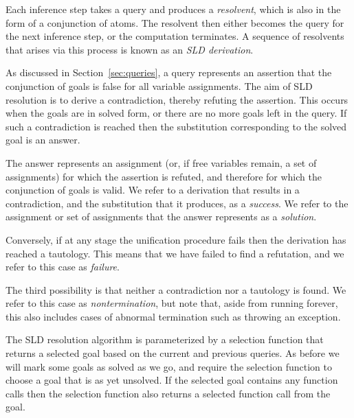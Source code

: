 Each inference step takes a query
and produces a \emph{resolvent\label{gi:resolvent}},
which is also in the form of a conjunction of atoms.
The resolvent then
either becomes the query for the next inference step,
or the computation terminates.
A sequence of resolvents that arises via this process
is known as an \emph{SLD derivation\label{gi:derivation}}.

As discussed in Section~\ref{sec:queries},
a query represents an assertion that
the conjunction of goals is false for all variable assignments.
The aim of SLD resolution is to derive a contradiction,
thereby refuting the assertion.
This occurs when the goals are in solved form,
or there are no more goals left in the query.
If such a contradiction is reached then
the substitution corresponding to the solved goal is an answer.

The answer represents an assignment
(or, if free variables remain, a set of assignments)
for which the assertion is refuted,
and therefore for which the conjunction of goals is valid.
We refer to a derivation that results in a contradiction,
and the substitution that it produces,
as a \emph{success\label{gi:success}}.
We refer to the assignment or set of assignments
that the answer\label{gi:answer2} represents
as a \emph{solution\label{gi:solution3}}.

Conversely,
if at any stage the unification procedure fails
then the derivation has reached a tautology.
This means that we have failed to find a refutation,
and we refer to this case as \emph{failure\label{gi:failure}}.

The third possibility is that
neither a contradiction nor a tautology is found.
We refer to this case as \emph{nontermination},
but note that, aside from running forever,
this also includes cases of
abnormal termination such as throwing an exception.

The SLD resolution algorithm is
parameterized by a selection function
that returns a selected goal
based on the current and previous queries.
As before we will mark some goals as solved as we go,
and require the selection function
to choose a goal that is as yet unsolved.
If the selected goal contains any function calls
then the selection function also returns
a selected function call from the goal.

